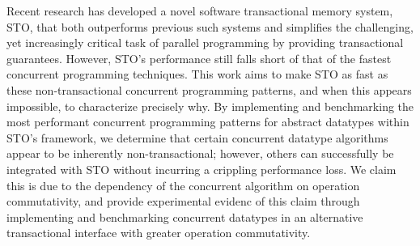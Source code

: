 Recent research has developed a novel software transactional memory system, STO, that both outperforms previous such systems and simplifies the challenging, yet increasingly critical task of parallel programming by providing transactional guarantees. However, STO's performance still falls short of that of the fastest concurrent programming techniques. This work aims to make STO as fast as these non-transactional concurrent programming patterns, and when this appears impossible, to characterize precisely why. By implementing and benchmarking the most performant concurrent programming patterns for abstract datatypes within STO's framework, we determine that certain concurrent datatype algorithms appear to be inherently non-transactional; however, others can successfully be integrated with STO without incurring a crippling performance loss. We claim this is due to the dependency of the concurrent algorithm on operation commutativity, and provide experimental evidenc of this claim through implementing and benchmarking concurrent datatypes in an alternative transactional interface with greater operation commutativity.
